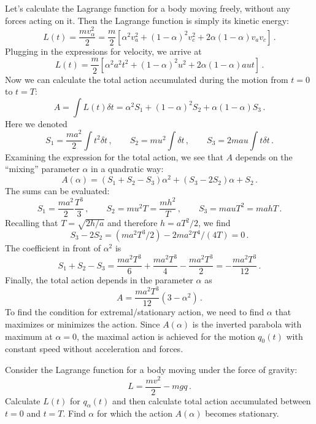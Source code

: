 Let's calculate the Lagrange function for a body moving freely,
without any forces acting on it. Then the Lagrange function is simply
its kinetic energy:
\[
L(t) = \frac{mv_\alpha^2}{2} = \frac{m}{2}\left\lbrack\alpha^2v_a^2+(1-\alpha)^2v_c^2+2\alpha(1-\alpha)v_av_c\right\rbrack\,.
\]
Plugging in the expressions for velocity, we arrive at
\[
L(t) = \frac{m}{2}\left\lbrack\alpha^2a^2t^2+(1-\alpha)^2u^2+2\alpha(1-\alpha)aut\right\rbrack\,.
\]
Now we can calculate the total action accumulated during the motion
from $t=0$ to $t=T$:
\[
A = \int L(t)\delta t = \alpha^2S_1 + (1-\alpha)^2S_2+\alpha(1-\alpha)S_3\,.
\]
Here we denoted
\[
S_1 = \frac{ma^2}{2}\int t^2\delta t\,,\qquad  S_2 = mu^2\int \delta t
\,,\qquad S_3= 2mau \int t\delta t\,.
\]
Examining the expression for the total action, we see that $A$ depends
on the ``mixing'' parameter $\alpha$ in a quadratic way:
\[
A(\alpha) = (S_1+S_2-S_3)\alpha^2 + (S_3-2S_2)\alpha  + S_2\,.
\]
The sums can be evaluated:
\[
S_1 = \frac{ma^2}{2}\frac{T^3}{3}\,,\qquad S_2 =
mu^2T=\frac{mh^2}{T}\,,\qquad S_3 = mauT^2 = mahT\,.
\]
Recalling that $T=\sqrt{2h/a}$ and therefore $h=aT^2/2$, we find
\[
S_3 - 2S_2 = (ma^2T^3/2) - 2ma^2T^4/(4T) = 0\,.
\]
The coefficient in front of $\alpha^2$ is
\[
S_1 + S_2 - S_3 = \frac{ma^2T^3}{6} + \frac{ma^2T^3}{4} -
\frac{ma^2T^3}{2} = -\frac{ma^2T^3}{12}\,.
\]
Finally, the total action depends in the parameter $\alpha$ as
\[
A = \frac{ma^2T^3}{12}(3-\alpha^2)\,.
\]
To find the condition for extremal/stationary action, we need to find
$\alpha$ that maximizes or minimizes the action. Since $A(\alpha)$ is
the inverted parabola with maximum at $\alpha=0$, the maximal action
is achieved for the motion $q_0(t)$ with constant speed without
acceleration and forces.
\begin{exercise}
	Consider the Lagrange function for a body moving under the force of
	gravity:
	\[
	L = \frac{mv^2}{2} - mgq\,.
	\]
	Calculate $L(t)$ for $q_\alpha(t)$ and then calculate total action
	accumulated between $t=0$ and $t=T$. Find $\alpha$ for which the
	action $A(\alpha)$ becomes stationary.
\end{exercise}

